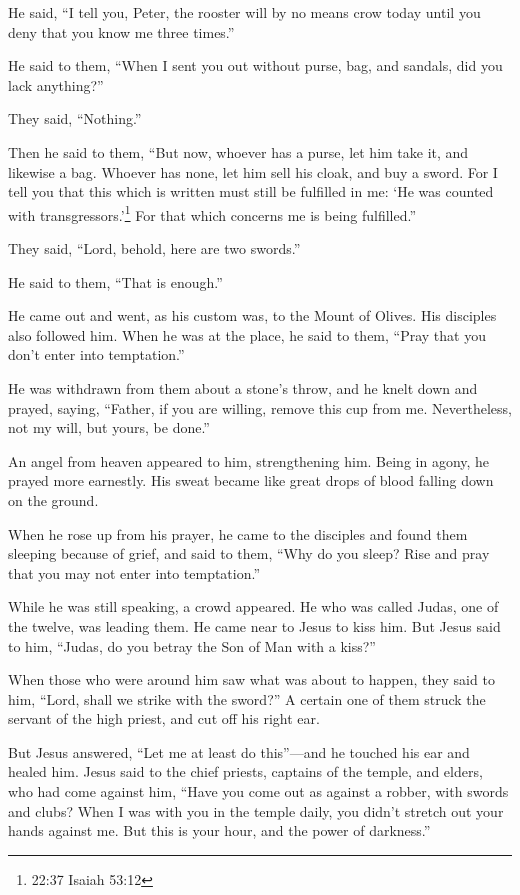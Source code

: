  He said, ``I tell you, Peter, the rooster will by no means
crow today until you deny that you know me three times.''

 He said to them, ``When I sent you out without purse, bag,
and sandals, did you lack anything?''

They said, ``Nothing.''

 Then he said to them, ``But now, whoever has a purse, let
him take it, and likewise a bag. Whoever has none, let him sell his
cloak, and buy a sword.  For I tell you that this which is
written must still be fulfilled in me: `He was counted with
transgressors.'\footnote{22:37 Isaiah 53:12} For that which concerns me
is being fulfilled.''

 They said, ``Lord, behold, here are two swords.''

He said to them, ``That is enough.''

 He came out and went, as his custom was, to the Mount of
Olives. His disciples also followed him.  When he was at
the place, he said to them, ``Pray that you don't enter into
temptation.''

 He was withdrawn from them about a stone's throw, and he
knelt down and prayed,  saying, ``Father, if you are
willing, remove this cup from me. Nevertheless, not my will, but yours,
be done.''

 An angel from heaven appeared to him, strengthening him.
 Being in agony, he prayed more earnestly. His sweat became
like great drops of blood falling down on the ground.

 When he rose up from his prayer, he came to the disciples
and found them sleeping because of grief,  and said to
them, ``Why do you sleep? Rise and pray that you may not enter into
temptation.''

 While he was still speaking, a crowd appeared. He who was
called Judas, one of the twelve, was leading them. He came near to Jesus
to kiss him.  But Jesus said to him, ``Judas, do you betray
the Son of Man with a kiss?''

 When those who were around him saw what was about to
happen, they said to him, ``Lord, shall we strike with the sword?''
 A certain one of them struck the servant of the high
priest, and cut off his right ear.

 But Jesus answered, ``Let me at least do this''---and he
touched his ear and healed him.  Jesus said to the chief
priests, captains of the temple, and elders, who had come against him,
``Have you come out as against a robber, with swords and clubs?
 When I was with you in the temple daily, you didn't
stretch out your hands against me. But this is your hour, and the power
of darkness.''

